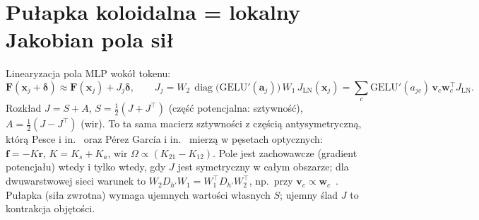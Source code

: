 \documentclass[a4paper,11pt]{article}
\newcommand{\LN}{\mathrm{LN}}
\newcommand{\GELU}{\mathrm{GELU}}
\begin{document}
\section{Pułapka koloidalna = lokalny Jakobian pola sił}\label{sec:pulapka}
Linearyzacja pola MLP wokół tokenu:
\begin{equation}
\bm F(\bm x_j+\bm\delta)\approx\bm F(\bm x_j)+J_j\bm\delta,\qquad
J_j=W_2\,\operatorname{diag}\!\big(\GELU'(\bm a_j)\big)\,W_1\,J_{\LN}(\bm x_j)=\sum_c \GELU'(a_{jc})\,\bm v_c\bm w_c^{\!\top}J_{\LN}.
\end{equation}
Rozkład $J=S+A$, $S=\tfrac12(J+J^{\!\top})$ (część potencjalna: sztywność), $A=\tfrac12(J-J^{\!\top})$ (wir). To ta sama
macierz sztywności z częścią antysymetryczną, którą Pesce i in.~\cite{pesce09} oraz Pérez García i in.~\cite{garcia18} mierzą
w pęsetach optycznych: $\bm f=-K\bm r$, $K=K_s+K_a$, wir $\Omega\propto(K_{21}-K_{12})$.
Pole jest zachowawcze (gradient potencjału) wtedy i tylko wtedy, gdy $J$ jest symetryczny w całym obszarze; dla dwuwarstwowej
sieci warunek to $W_2D_{h'}W_1=W_1^{\!\top}D_{h'}W_2^{\!\top}$, np.\ przy $\bm v_c\propto\bm w_c$~\cite{im16}.
Pułapka (siła zwrotna) wymaga ujemnych wartości własnych $S$; ujemny ślad $J$ to kontrakcja objętości.
\end{document}
